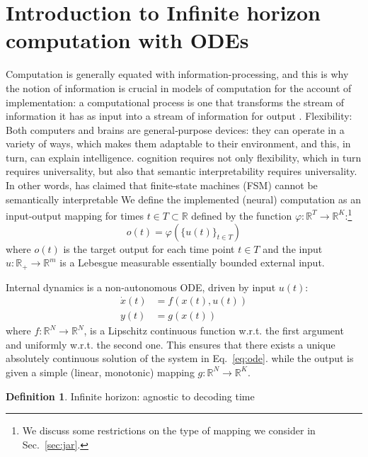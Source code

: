 \documentclass{scrartcl}
\theoremstyle{definition}
\newtheorem{definition}{Definition}
\theoremstyle{remark}
\newcommand{\reals}{\mathbb{R}}
\begin{document}
\section{Introduction to Infinite horizon computation with ODEs}	
Computation is generally equated with information-processing, and this is why the notion of information is crucial in models of computation for the account of implementation: a computational process is one that transforms the stream of information it has as input into a stream of information for output \citep{milkowski2014}.
Flexibility: Both computers and brains are general‑purpose devices: they can operate in a variety of ways, which makes them adaptable to their environment, and this, in turn, can explain intelligence. \citep{milkowski2018computermetaphor}
cognition requires not only flexibility, which in turn requires universality, but also that semantic interpretability requires universality.
 In other words, \citep{pylyshyn1984} has claimed that finite‑state machines (FSM) cannot be semantically interpretable
We define the implemented (neural) computation as an input-output mapping for times $t\in T\subset\reals$ defined by the function $\varphi:\reals^T\rightarrow\reals^K$:\footnote{We discuss some restrictions on the type of mapping we consider in Sec.~\ref{sec:jar}.}
\begin{equation}
o(t) = \varphi(\{u(t)\}_{t\in T})
\end{equation}
where $o(t)$ is the target output for each time point $t\in T$ and the input  $u:\reals_{+}\to \reals^{m}$  is a Lebesgue measurable essentially bounded external input.

Internal dynamics is a non-autonomous ODE, driven by input $u(t)$:
\begin{align}
\dot x(t) &= f(x(t),u(t))\label{eq:ode}\\
y(t) &= g(x(t))	\label{eq:output}
\end{align}
where $f:\reals^N\rightarrow\reals^N$, is a Lipschitz continuous function w.r.t. the first argument and uniformly w.r.t. the second one. This ensures that there exists a unique absolutely continuous solution of the system in Eq.~\ref{eq:ode}.
while the output is given a simple (linear, monotonic) mapping $g:\reals^N\rightarrow\reals^K$.

\begin{definition}
Infinite horizon: agnostic to decoding time
\end{definition}
\end{document}
